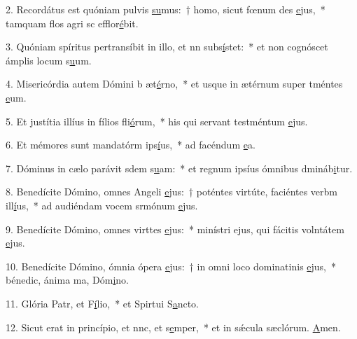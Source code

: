 2. Recordátus est quóniam pulvis \uline{su}mus:~† homo, sicut fœnum des \uline{e}jus,~* tamquam flos agri sc efflor\uline{é}bit.\par 
3. Quóniam spíritus pertransíbit in illo, et nn subs\uline{í}stet:~* et non cognóscet ámplis locum s\uline{u}um.\par 
4. Misericórdia autem Dómini b æt\uline{é}rno,~* et usque in ætérnum super tméntes \uline{e}um.\par 
5. Et justítia illíus in fílios fli\uline{ó}rum,~* his qui servant testméntum \uline{e}jus.\par 
6. Et mémores sunt mandatórm ips\uline{í}us,~* ad facéndum \uline{e}a.\par 
7. Dóminus in cælo parávit sdem s\uline{u}am:~* et regnum ipsíus ómnibus dmináb\uline{i}tur.\par 
8. Benedícite Dómino, omnes Angeli \uline{e}jus:~† poténtes virtúte, faciéntes verbm ill\uline{í}us,~* ad audiéndam vocem srmónum \uline{e}jus.\par 
9. Benedícite Dómino, omnes virttes \uline{e}jus:~* minístri ejus, qui fácitis volntátem \uline{e}jus.\par 
10. Benedícite Dómino, ómnia ópera \uline{e}jus:~† in omni loco dominatinis \uline{e}jus,~* bénedic, ánima ma, Dóm\uline{i}no.\par 
11. Glória Patr, et F\uline{í}lio,~* et Spirtui S\uline{a}ncto.\par 
12. Sicut erat in princípio, et nnc, et s\uline{e}mper,~* et in sǽcula sæclórum. \uline{A}men.\par 
